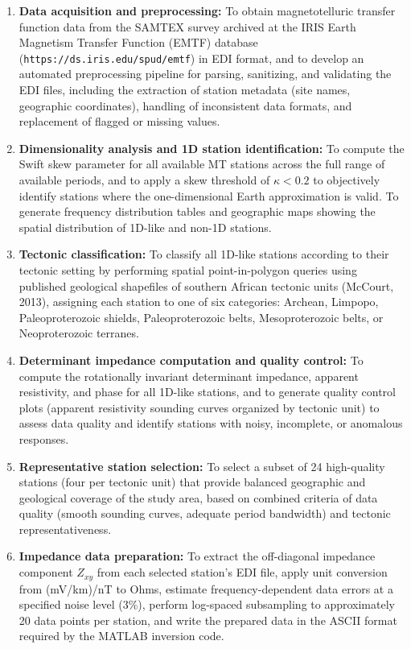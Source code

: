 \begin{enumerate}
    \item \textbf{Data acquisition and preprocessing:} To obtain magnetotelluric transfer function data from the SAMTEX survey archived at the IRIS Earth Magnetism Transfer Function (EMTF) database (\texttt{https://ds.iris.edu/spud/emtf}) in EDI format, and to develop an automated preprocessing pipeline for parsing, sanitizing, and validating the EDI files, including the extraction of station metadata (site names, geographic coordinates), handling of inconsistent data formats, and replacement of flagged or missing values.

    \item \textbf{Dimensionality analysis and 1D station identification:} To compute the Swift skew parameter for all available MT stations across the full range of available periods, and to apply a skew threshold of $\kappa < 0.2$ to objectively identify stations where the one-dimensional Earth approximation is valid. To generate frequency distribution tables and geographic maps showing the spatial distribution of 1D-like and non-1D stations.

    \item \textbf{Tectonic classification:} To classify all 1D-like stations according to their tectonic setting by performing spatial point-in-polygon queries using published geological shapefiles of southern African tectonic units (McCourt, 2013), assigning each station to one of six categories: Archean, Limpopo, Paleoproterozoic shields, Paleoproterozoic belts, Mesoproterozoic belts, or Neoproterozoic terranes.

    \item \textbf{Determinant impedance computation and quality control:} To compute the rotationally invariant determinant impedance, apparent resistivity, and phase for all 1D-like stations, and to generate quality control plots (apparent resistivity sounding curves organized by tectonic unit) to assess data quality and identify stations with noisy, incomplete, or anomalous responses.

    \item \textbf{Representative station selection:} To select a subset of 24 high-quality stations (four per tectonic unit) that provide balanced geographic and geological coverage of the study area, based on combined criteria of data quality (smooth sounding curves, adequate period bandwidth) and tectonic representativeness.

    \item \textbf{Impedance data preparation:} To extract the off-diagonal impedance component $Z_{xy}$ from each selected station's EDI file, apply unit conversion from (mV/km)/nT to Ohms, estimate frequency-dependent data errors at a specified noise level (3\%), perform log-spaced subsampling to approximately 20 data points per station, and write the prepared data in the ASCII format required by the MATLAB inversion code.


\end{enumerate}
